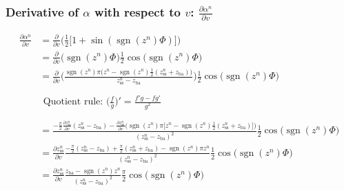 \documentclass{article}
\DeclareMathOperator{\sgn}{sgn}
\begin{document}
\subsubsection*{Derivative of $\alpha$ with respect to $v$: $\frac{\partial \alpha^n}{\partial v}$}
\begin{equation}
    \begin{aligned}
        \frac{\partial \alpha^n}{\partial v} &= \frac{\partial}{\partial v}\Bigg(\frac{1}{2}\big[1+\sin(\sgn(z^n)\Phi)\big]\Bigg)\\
        &= \frac{\partial}{\partial v}\Big(\sgn(z^n)\Phi\Big)\frac{1}{2}\cos\big(\sgn(z^n)\Phi\big)\\
        &= \frac{\partial}{\partial v}\Bigg(\frac{\sgn(z^n)\pi\big(z^n-\sgn(z^n)\frac{1}{2}(z_\text{ss}^n+z_\text{ba})\big)}{z_\text{ss}^n-z_\text{ba}}\Bigg)\frac{1}{2}\cos\big(\sgn(z^n)\Phi\big)\\
        &\\
        &\begin{gathered}
        \text{Quotient rule: }\boxed{\Bigg(\frac{f}{g}\Bigg)' = \frac{f'g - fg'}{g^2}}
        \end{gathered}
        \\
        &\\
        &= \frac{-\frac{\pi}{2}\frac{\partial z_\text{ss}^n}{\partial v}(z_\text{ss}^n-z_\text{ba}) - \frac{\partial z_\text{ss}^n}{\partial v}\Big(\sgn(z^n)\pi\big[z^n-\sgn(z^n)\frac{1}{2}(z_\text{ss}^n+z_\text{ba})\Big]\bigg)}{(z_\text{ss}^n - z_\text{ba})^2}\frac{1}{2}\cos\big(\sgn(z^n)\Phi\big)\\
        &= \frac{\partial z_\text{ss}^n}{\partial v}\frac{-\frac{\pi}{2}(z_\text{ss}^n-z_\text{ba}) + \frac{\pi}{2}(z_\text{ss}^n+z_\text{ba})-\sgn(z^n)\pi z^n}{(z_\text{ss}^n - z_\text{ba})^2}\frac{1}{2}\cos\big(\sgn(z^n)\Phi\big)\\
        &= \frac{\partial z_\text{ss}^n}{\partial v}\frac{z_\text{ba} - \sgn(z^n) z^n}{(z_\text{ss}^n - z_\text{ba})^2}\frac{\pi}{2}\cos\big(\sgn(z^n)\Phi\big)
    \end{aligned}
\end{equation}
\end{document}
